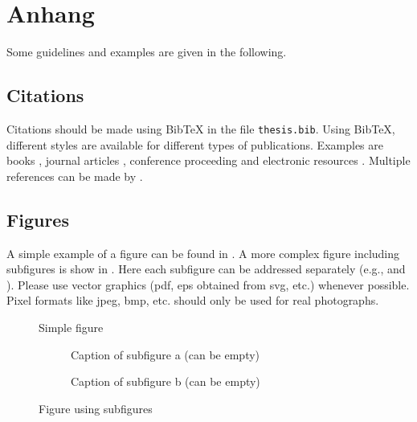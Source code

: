 \chapter{Anhang}

Some guidelines and examples are given in the following.

\section{Citations}

Citations should be made using BibTeX in the file \verb|thesis.bib|.
Using BibTeX, different styles are available for different types of publications. Examples are books \cite{Adams90}, journal articles \cite{Zhang99}, conference proceeding \cite{Yee99} and
electronic resources \cite{Fear05}. Multiple references can be made by \cite{Adams90,Zhang99,Yee99,Fear05}.


\section{Figures}

A simple example of a figure can be found in . A more complex figure including subfigures is show in . Here each subfigure can be addressed separately (e.g.,  and ). Please use vector graphics (pdf, eps obtained from svg, etc.) whenever possible. Pixel formats like jpeg, bmp, etc. should only be used for real photographs.

\begin{figure}[!h]
	\centering
	\fbox{\parbox{5cm}{\centering ~\vspace{1.5cm}\\Dummy\\~\vspace{1.5cm}}} %
	\caption{Simple figure}
	\label{fig:simple_figure}
\end{figure}

\begin{figure}[!h]
	\centering
	\begin{subfigure}[b]{7cm}
		\centering
		\fbox{\parbox{5cm}{\centering ~\vspace{1.5cm}\\Dummy\\~\vspace{1.5cm}}} %
		\caption{Caption of subfigure a (can be empty)}
		\label{fig:subfigure1}
	\end{subfigure}
	\begin{subfigure}[b]{7cm}
		\centering
		\fbox{\parbox{5cm}{\centering ~\vspace{1.5cm}\\Dummy\\~\vspace{1.5cm}}} %
		\caption{Caption of subfigure b (can be empty)}
		\label{fig:subfigure2}
	\end{subfigure}
	\caption{Figure using subfigures}
	\label{fig:figure_with_subfigures}
\end{figure}


